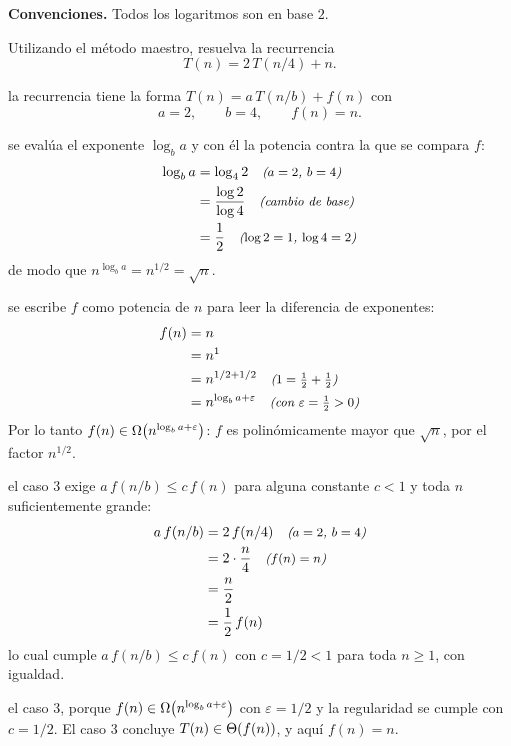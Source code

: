 \documentclass[11pt,letterpaper]{article}
\begin{document}

\noindent\textbf{Convenciones.}
Todos los logaritmos son en base $2$.

\noindent Utilizando el método maestro, resuelva la recurrencia
\[
  T(n) = 2\,T(n/4) + n.
\]

 la recurrencia tiene la forma
$T(n) = a\,T(n/b) + f(n)$ con
\[
  a = 2, \qquad b = 4, \qquad f(n) = n.
\]

 se evalúa el exponente
$\log_b a$ y con él la potencia contra la que se compara $f$:
\begin{align*}
  \log_b a &= \log_4 2 \quad\text{\small\itshape ($a = 2$, $b = 4$)} \\
           &= \frac{\log 2}{\log 4} \quad\text{\small\itshape (cambio de base)} \\
           &= \frac{1}{2} \quad\text{\small\itshape ($\log 2 = 1$, $\log 4 = 2$)}
\end{align*}
de modo que $n^{\log_b a} = n^{1/2} = \sqrt{n}$.

 se escribe $f$ como
potencia de $n$ para leer la diferencia de exponentes:
\begin{align*}
  f(n) &= n \\
       &= n^{1} \\
       &= n^{1/2 + 1/2} \quad\text{\small\itshape ($1 = \tfrac{1}{2} + \tfrac{1}{2}$)} \\
       &= n^{\log_b a + \varepsilon}
          \quad\text{\small\itshape (con $\varepsilon = \tfrac{1}{2} > 0$)}
\end{align*}
Por lo tanto $f(n) \in \Omega\!\left(n^{\log_b a + \varepsilon}\right)$: $f$ es
polinómicamente mayor que $\sqrt{n}$, por el factor $n^{1/2}$.

 el caso 3 exige
$a\,f(n/b) \le c\,f(n)$ para alguna constante $c < 1$ y toda $n$
suficientemente grande:
\begin{align*}
  a\,f(n/b) &= 2\,f(n/4) \quad\text{\small\itshape ($a = 2$, $b = 4$)} \\
            &= 2 \cdot \frac{n}{4} \quad\text{\small\itshape ($f(n) = n$)} \\
            &= \frac{n}{2} \\
            &= \frac{1}{2}\,f(n)
\end{align*}
lo cual cumple $a\,f(n/b) \le c\,f(n)$ con $c = 1/2 < 1$ para toda
$n \ge 1$, con igualdad.

 el caso 3, porque
$f(n) \in \Omega\!\left(n^{\log_b a + \varepsilon}\right)$ con
$\varepsilon = 1/2$ y la regularidad se cumple con $c = 1/2$. El caso
3 concluye $T(n) \in \Theta\!\left(f(n)\right)$, y aquí $f(n) = n$.
\end{document}
